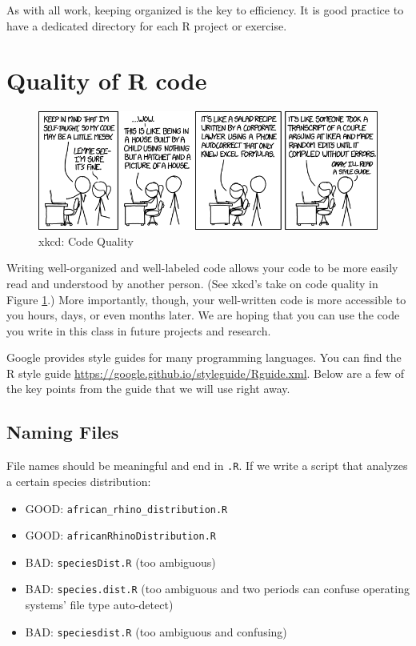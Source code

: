 \documentclass[12pt,oneside]{book}\usepackage[]{graphicx}\usepackage[]{color}
\newcommand{\bi}{\begin{itemize}}
\newcommand{\ei}{\end{itemize}}
\newenvironment{vid}[1]{
  \begin{video}[htbp]
    \captionsetup{textformat=empty,labelformat=empty}
    \caption{#1}
    \centering
    \begin{tikzpicture}
      \node[anchor=text,text width=\columnwidth-1.2cm, draw=fblue, rounded corners, line width=1pt, fill=fblue!10, inner sep=5mm] (big) {\\#1};
      \node[draw=fblue, rounded corners, line width=.5pt, fill=fblue!40, anchor=west, xshift=5mm] (small) at (big.north west) {Video \thevideo};
    \end{tikzpicture}
  \end{video}
}
\renewcommand\thevideo{\arabic{video}}
\begin{document}
As with all work, keeping organized is the key to efficiency. It is good practice to have a dedicated directory for each R project or exercise. 



\section{Quality of R code}

\begin{figure}[htbp]
\includegraphics*[width=5.5in]{02-introToR/02-images/code_quality.png}
\caption{xkcd: Code Quality}
\label{FIG:COMIC}
\end{figure}

Writing well-organized and well-labeled code allows your code to be more easily read and understood by another person. (See xkcd's take on code quality in Figure \ref{FIG:COMIC}.) More importantly, though, your well-written code is more accessible to you hours, days, or even months later. We are hoping that you can use the code you write in this class in future projects and research.

Google provides style guides for many programming languages. You can find the R style guide \href{here}{https://google.github.io/styleguide/Rguide.xml}. Below are a few of the key points from the guide that we will use right away.

\subsection{Naming Files}
File names should be meaningful and end in \verb+.R+. If we write a script that analyzes a certain species distribution: 
\bi
   \item GOOD: {\color[RGB]{34,139,34}\verb+african_rhino_distribution.R+} 
   \item GOOD: {\color[RGB]{34,139,34}\verb+africanRhinoDistribution.R+} 
   \item BAD: {\color{red}\verb+speciesDist.R+} (too ambiguous)
   \item BAD:  {\color{red}\verb+species.dist.R+} (too ambiguous and two periods can confuse operating systems' file type auto-detect)
   \item BAD:  {\color{red}\verb+speciesdist.R+} (too ambiguous and confusing)
\ei
\end{document}
